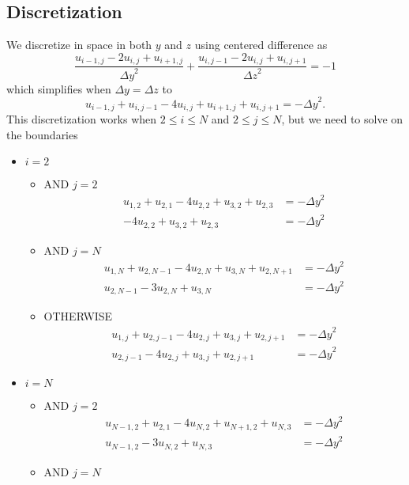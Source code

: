 \documentclass[10pt]{article}
\begin{document}
	\subsection{Discretization}
	We discretize in space in both $ y $ and $ z $ using centered difference as
	\begin{equation}
		\frac{u_{i-1,j} - 2u_{i,j} + u_{i+1,j}}{{\Delta y}^2} + \frac{u_{i,j-1} - 2u_{i,j} + u_{i,j+1}}{{\Delta z}^2} = -1
	\end{equation}
	which simplifies when $ \Delta y = \Delta z $ to
	\begin{equation}
		u_{i-1,j} + u_{i,j-1} - 4u_{i,j} + u_{i+1,j} + u_{i,j+1} = -{\Delta y}^2.
	\end{equation}
	This discretization works when $ 2\leq i\leq N $ and $ 2\leq j\leq N $, but we need to solve on the boundaries
	\begin{itemize}
		\item $ i = 2 $
		\begin{itemize}
			\item AND $ j = 2 $
			\begin{align*}
				u_{1,2} + u_{2,1} - 4u_{2,2} + u_{3,2} + u_{2,3} &= -{\Delta y}^2\\
				- 4u_{2,2} + u_{3,2} + u_{2,3} &= -{\Delta y}^2
			\end{align*}
			\item AND $ j = N $
			\begin{align*}
				u_{1,N} + u_{2,N-1} - 4u_{2,N} + u_{3,N} + u_{2,N+1} &= -{\Delta y}^2\\
				u_{2,N-1} - 3u_{2,N} + u_{3,N} &= -{\Delta y}^2
			\end{align*}
			\item OTHERWISE
			\begin{align*}
				u_{1,j} + u_{2,j-1} - 4u_{2,j} + u_{3,j} + u_{2,j+1} &= -{\Delta y}^2\\
				u_{2,j-1} - 4u_{2,j} + u_{3,j} + u_{2,j+1} &= -{\Delta y}^2
			\end{align*}
		\end{itemize}
		\item $ i = N $
		\begin{itemize}
			\item AND $ j = 2 $
			\begin{align*}
				u_{N-1,2} + u_{2,1} - 4u_{N,2} + u_{N+1,2} + u_{N,3} &= -{\Delta y}^2\\
				u_{N-1,2} - 3u_{N,2} + u_{N,3} &= -{\Delta y}^2
			\end{align*}
			\item AND $ j = N $

\end{itemize}
\end{itemize}
\end{document}
